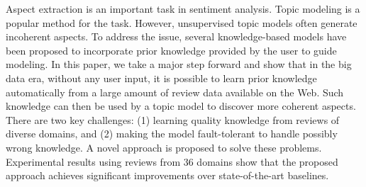 Aspect extraction is an important task in sentiment analysis. Topic modeling is a popular method for the task. However, unsupervised topic models often generate incoherent aspects. To address the issue, several knowledge-based models have been proposed to incorporate prior knowledge provided by the user to guide modeling. In this paper, we take a major step forward and show that in the big data era, without any user input, it is possible to learn prior knowledge automatically from a large amount of review data available on the Web. Such knowledge can then be used by a topic model to discover more coherent aspects. There are two key challenges: (1) learning quality knowledge from reviews of diverse domains, and (2) making the model fault-tolerant to handle possibly wrong knowledge. A novel approach is proposed to solve these problems. Experimental results using reviews from 36 domains show that the proposed approach achieves significant improvements over state-of-the-art baselines.

